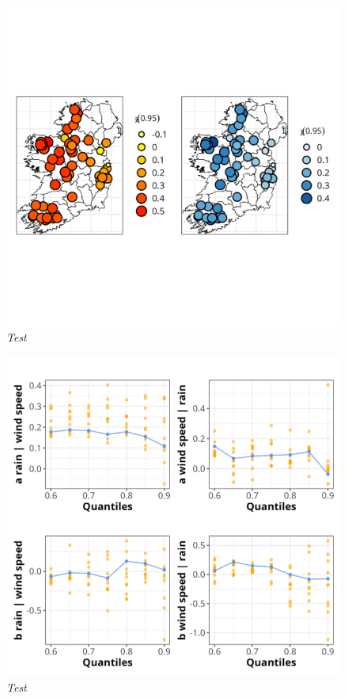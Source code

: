 \documentclass{article}
\numberwithin{equation}{section}
\begin{document}
\begin{figure}[H]
    \centering
    \includegraphics[width = 0.9\linewidth]{plots/041_chi_plots.png}
    \caption{\emph{Test}}
    \label{fig:04_chi}
\end{figure}

\begin{figure}[H]
    \centering
    \includegraphics[width = 0.9\linewidth]{plots/042_bootstrap_thresh.png}
    \caption{\emph{Test}}
    \label{fig:04_bootstrap_thresh}
\end{figure}
\end{document}
